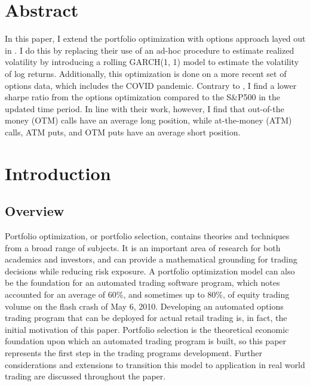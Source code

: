 \renewcommand{\contentsname}{Table of Contents}
\tableofcontents

\clearpage

\section{Abstract}\label{sec:Abstract}

In this paper, I extend the portfolio optimization with options approach layed out in \cite{faias2017optimal}. I do this by replacing their use of an ad-hoc procedure to estimate realized volatility by introducing a rolling GARCH(1, 1) model to estimate the volatility of log returns. Additionally, this optimization is done on a more recent set of options data, which includes the COVID pandemic. Contrary to \cite{faias2017optimal}, I find a lower sharpe ratio from the options optimization compared to the S\&P500 in the updated time period. In line with their work, however, I find that out-of-the money (OTM) calls have an average long position, while at-the-money (ATM) calls, ATM puts, and OTM puts have an average short position.

\clearpage

\section{Introduction}\label{sec:Introduction}

\subsection{Overview}

Portfolio optimization, or portfolio selection, contains theories and techniques from a broad range of subjects. It is an important area of research for both academics and investors, and can provide a mathematical grounding for trading decisions while reducing risk exposure. A portfolio optimization model can also be the foundation for an automated trading software program, which \cite{malmgren2011computerized} notes accounted for an average of 60\%, and sometimes up to 80\%, of equity trading volume on the flash crash of May 6, 2010. Developing an automated options trading program that can be deployed for actual retail trading is, in fact, the initial motivation of this paper. Portfolio selection is the theoretical economic foundation upon which an automated trading program is built, so this paper represents the first step in the trading programs development. Further considerations and extensions to transition this model to application in real world trading are discussed throughout the paper.

